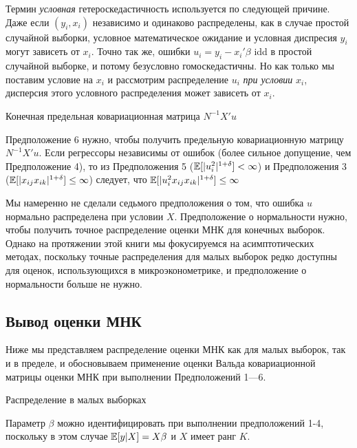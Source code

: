 Термин \textit{условная} гетероскедастичность используется по следующей причине. Даже если $(y_i, x_i)$ независимо и одинаково распределены, как в случае простой случайной выборки, условное математическое ожидание и условная диспресия $y_i$ могут зависеть от $x_i$. Точно так же, ошибки $u_i = y_i - x_i'\beta$ idd в простой случайной выборке, и потому безусловно гомоскедастичны. Но как только мы поставим условие на $x_i$ и рассмотрим распределение $u_i$ \textit{при условии} $x_i$, дисперсия этого условного распределения может зависеть от $x_i$.

\begin{center}
Конечная предельная ковариационная матрица $N^{-1}X'u$ 
\end{center}
Предположение 6 нужно, чтобы получить предельную ковариационную матрицу $N^{-1}X'u$. Если регрессоры независимы от ошибок (более сильное допущение, чем Предположение 4), то из Предположения 5 ($\mathbb{E} [|u_i^2|^{1+\delta}]< \infty$) и Предположения 3 ($\mathbb{E}[|x_{ij}x_{ik}|^{1+\delta}]\leq \infty$) следует, что $\mathbb{E}[|u_i^2 x_{ij}x_{ik}|^{1+\delta}]\leq \infty$

Мы намеренно не сделали седьмого предположения о том, что ошибка $u$ нормально распределена при условии $X$. Предположение о нормальности нужно, чтобы получить точное распределение оценки МНК для конечных выборок. Однако на протяжении этой книги мы фокусируемся на асимптотических методах, поскольку точные распределения для малых выборок редко доступны для оценок, использующихся в микроэконометрике, и предположение о нормальности больше не нужно.

\subsection{Вывод оценки МНК}
Ниже мы представляем распределение оценки МНК как для малых выборок, так и в пределе, и обосновываем применение оценки Вальда ковариационной матрицы оценки МНК при выполнении Предположений 1---6.

\begin{center}
 Распределение в малых выборках
 \end{center} 

Параметр $\beta$ можно идентифицировать при выполнении предположений 1-4, поскольку в этом случае $\mathbb{E}	[y|X] = X\beta$ и $X$ имеет ранг $K$.

